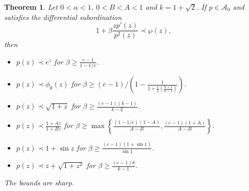 \documentclass[12pt, reqno]{amsart}
\numberwithin{equation}{section}
\theoremstyle{plain}
\newtheorem{theorem}{Theorem}[section]
\theoremstyle{definition}
\theoremstyle{remark}
\begin{document}
\begin{theorem}\label{n-gretr-2}
	Let $0<\alpha<1$, $0<B<A<1$ and $k=1+\sqrt{2}$. If $p\in \mathcal{A}_{0}$ and satisfies the differential subordination
	\begin{equation*}
	1+\beta \frac{zp'(z)}{p^2(z)} \prec \wp(z),  
	\end{equation*}  
	then
	\begin{itemize}
		\item [$(i)$] $p(z)\prec e^z$   for $\beta\geq \frac{e-1}{1-1/e}$.
		\item [$(ii)$] $p(z) \prec \phi_0(z)$   for $\beta\geq (e-1)/\left(1-\frac{1}{1+\frac{1}{k}\left(\frac{k+1}{k-1}\right)}\right)$.
		\item [$(iii)$] $p(z)\prec \sqrt{1+z}$   for $\beta\geq \frac{(e-1)(k-1)}{k-2}$.
		\item [$(iv)$] $p(z)\prec \frac{1+Az}{1+Bz}$   for $\beta\geq \max\left\{\frac{(1-1/e)(1-A)}{A-B}, \frac{(e-1)(1+A)}{A-B}\right\}$.
		\item [$(v)$] $p(z)\prec 1+\sin{z}$   for $\beta\geq \frac{(e-1)(1+\sin{1})}{\sin{1}}$.
		\item [$(vi)$] $p(z)\prec z+\sqrt{1+z^2}$   for $\beta\geq \frac{(e-1)k}{k-1}$.
	\end{itemize}
	The bounds are sharp.
\end{theorem}
\end{document}

